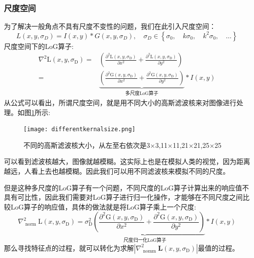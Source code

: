 \subsubsection{尺度空间}
为了解决一般角点不具有尺度不变性的问题，我们在此引入尺度空间：
\begin{equation}
L\left(x, y, \sigma_{D}\right)=I(x, y) * G\left(x, y, \sigma_{D}\right), \quad \sigma_{D} \in\left\{\sigma_{0}, \quad k \sigma_{0}, \quad k^{2} \sigma_{0}, \quad \dots\right\}
\end{equation}
尺度空间下的LoG算子:
\begin{equation}
\begin{aligned}
\nabla^{2} \mathrm{L}\left(x, y, \sigma_{\mathrm{D}}\right)=&\left(\frac{\partial^{2} \mathrm{L}\left(x, y, \sigma_{\mathrm{D}}\right)}{\partial x^{2}}+\frac{\partial^{2} \mathrm{L}\left(x, y, \sigma_{\mathrm{D}}\right)}{\partial y^{2}}\right)\\
=&\underbrace{\left(\frac{\partial^{2} \mathrm{G}\left(x, y, \sigma_{\mathrm{D}}\right)}{\partial x^{2}}+\frac{\partial^{2} \mathrm{G}\left(x, y, \sigma_{\mathrm{D}}\right)}{\partial y^{2}}\right)}_\text{多尺度LoG算子}*I(x,y)
\end{aligned}
\end{equation}
从公式可以看出，所谓尺度空间，就是用不同大小的高斯滤波核来对图像进行处理。如图\ref{differentkernalsize}所示:
\begin{figure}[H]
	\centering
	\texttt{[image: differentkernalsize.png]}
	\caption{不同的高斯滤波核大小，从左至右依次是3$\times$3,11$\times$11,21$\times$21,25$\times$25}\label{differentkernalsize}
\end{figure}\par
可以看到滤波核越大，图像就越模糊。这实际上也是在模拟人类的视觉，因为距离越远，人看上去也越模糊。因此我们可以用不同滤波核来模拟不同的尺度。\par
但是这种多尺度的LoG算子有一个问题，不同尺度的LoG算子计算出来的响应值不具有可比性，因此我们需要对LoG算子进行归一化操作，才能够在不同尺度之间比较LoG算子的响应值，具体的做法就是将LoG算子乘上一个尺度:
\begin{equation}
\nabla_{\text { norm }}^{2} \mathrm{L}\left(x, y, \sigma_{\mathrm{D}}\right)= 
\underbrace{\sigma_{\mathrm{D}}^{2}\left(\frac{\partial^{2} \mathrm{G}\left(x, y, \sigma_{\mathrm{D}}\right)}{\partial x^{2}}+\frac{\partial^{2} \mathrm{G}\left(x, y, \sigma_{\mathrm{D}}\right)}{\partial y^{2}}\right)}_\text{尺度归一化LoG算子} * I(x, y)
\end{equation}
那么寻找特征点的过程，就可以转化为求解$| \nabla_{\text { nomm }}^{2} \mathbf{L}\left(x, y, \sigma_{\mathrm{D}}\right) |$最值的过程。\par
